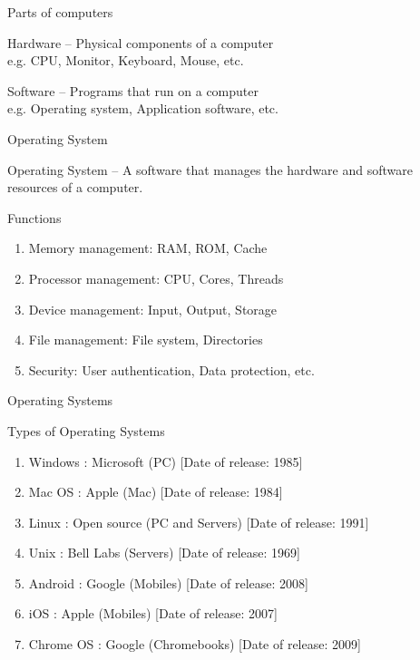 \documentclass[aspectratio=169]{beamer}
\begin{document}
\begin{frame}{Parts of computers}

\begin{block}{Hardware}
    -- Physical components of a computer \\
    e.g. CPU, Monitor, Keyboard, Mouse, etc.
\end{block}

\begin{block}{Software}
    -- Programs that run on a computer \\
    e.g. Operating system, Application software, etc.
\end{block}
    
\end{frame}


\begin{frame}{Operating System}
    \begin{block}{Operating System}
        -- A software that manages the hardware and software resources of a computer.
    \end{block}

    \begin{block}{Functions}
        \begin{enumerate}
            \item Memory management: RAM, ROM, Cache
            \item Processor management: CPU, Cores, Threads
            \item Device management: Input, Output, Storage
            \item File management: File system, Directories
            \item Security: User authentication, Data protection, etc.
        \end{enumerate}
    \end{block}

\end{frame}

\begin{frame}{Operating Systems}
    \begin{block}{Types of Operating Systems}
        \begin{enumerate}
            \item Windows : Microsoft (PC) [Date of release: 1985]
            \item Mac OS : Apple (Mac) [Date of release: 1984]
            \item Linux : Open source (PC and Servers) [Date of release: 1991]
            \item Unix : Bell Labs (Servers) [Date of release: 1969]
            \item Android : Google (Mobiles) [Date of release: 2008]
            \item iOS : Apple (Mobiles) [Date of release: 2007]
            \item Chrome OS : Google (Chromebooks) [Date of release: 2009]
        \end{enumerate}
    \end{block}
\end{frame}
\end{document}
